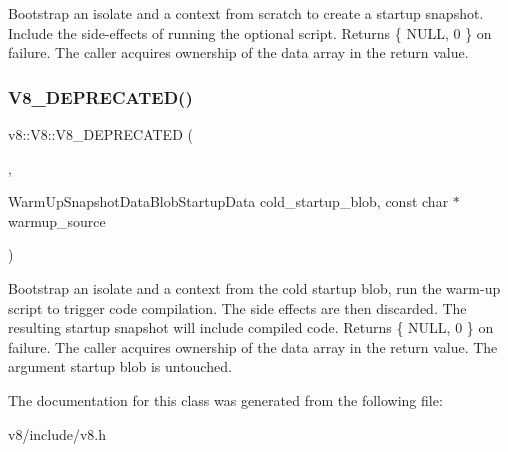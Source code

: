 Bootstrap an isolate and a context from scratch to create a startup snapshot. Include the side-\/effects of running the optional script. Returns \{ N\+U\+LL, 0 \} on failure. The caller acquires ownership of the data array in the return value. \mbox{\label{classv8_1_1V8_ac6020fb485b53eb8e5a6c1e3a8cbee63}} 
\subsubsection{\texorpdfstring{V8\+\_\+\+D\+E\+P\+R\+E\+C\+A\+T\+E\+D()}{V8\_DEPRECATED()}\hspace{0.1cm}{\footnotesize\ttfamily [2/2]}}
{\footnotesize\ttfamily v8\+::\+V8\+::\+V8\+\_\+\+D\+E\+P\+R\+E\+C\+A\+T\+ED (\begin{DoxyParamCaption}\item[{\char`\"{}Use \mbox{\hyperlink{classv8_1_1SnapshotCreator}{Snapshot\+Creator}}\char`\"{}}]{,  }\item[{static \mbox{\hyperlink{classv8_1_1StartupData}{Startup\+Data}} }]{Warm\+Up\+Snapshot\+Data\+BlobStartup\+Data cold\+\_\+startup\+\_\+blob, const char $\ast$warmup\+\_\+source }\end{DoxyParamCaption})}

Bootstrap an isolate and a context from the cold startup blob, run the warm-\/up script to trigger code compilation. The side effects are then discarded. The resulting startup snapshot will include compiled code. Returns \{ N\+U\+LL, 0 \} on failure. The caller acquires ownership of the data array in the return value. The argument startup blob is untouched. 

The documentation for this class was generated from the following file\+:\begin{DoxyCompactItemize}
\item 
v8/include/v8.\+h\end{DoxyCompactItemize}
